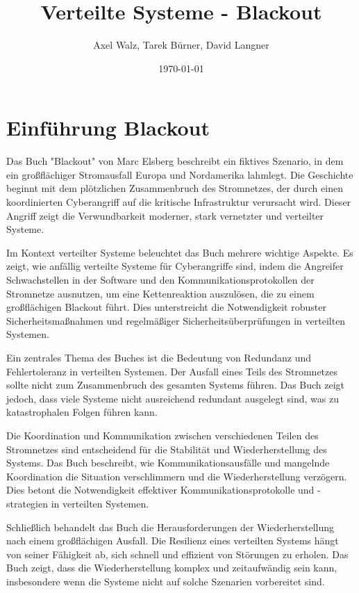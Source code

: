 \documentclass[a4paper,12pt]{article}
\title{Verteilte Systeme - Blackout}
\author{Axel Walz, Tarek Bürner, David Langner}
\date{\today}
\let\stdsection\section
\renewcommand\section{\newpage\stdsection}
\begin{document}
\onehalfspacing %

\maketitle

\newpage 
\tableofcontents
\newpage 

\section{Einführung Blackout}
Das Buch "Blackout" von Marc Elsberg beschreibt ein fiktives Szenario, in dem ein großflächiger Stromausfall Europa und Nordamerika lahmlegt. Die Geschichte beginnt mit dem plötzlichen Zusammenbruch des Stromnetzes, der durch einen koordinierten Cyberangriff auf die kritische Infrastruktur verursacht wird. Dieser Angriff zeigt die Verwundbarkeit moderner, stark vernetzter und verteilter Systeme.

Im Kontext verteilter Systeme beleuchtet das Buch mehrere wichtige Aspekte. Es zeigt, wie anfällig verteilte Systeme für Cyberangriffe sind, indem die Angreifer Schwachstellen in der Software und den Kommunikationsprotokollen der Stromnetze ausnutzen, um eine Kettenreaktion auszulösen, die zu einem großflächigen Blackout führt. Dies unterstreicht die Notwendigkeit robuster Sicherheitsmaßnahmen und regelmäßiger Sicherheitsüberprüfungen in verteilten Systemen.

Ein zentrales Thema des Buches ist die Bedeutung von Redundanz und Fehlertoleranz in verteilten Systemen. Der Ausfall eines Teils des Stromnetzes sollte nicht zum Zusammenbruch des gesamten Systems führen. Das Buch zeigt jedoch, dass viele Systeme nicht ausreichend redundant ausgelegt sind, was zu katastrophalen Folgen führen kann.

Die Koordination und Kommunikation zwischen verschiedenen Teilen des Stromnetzes sind entscheidend für die Stabilität und Wiederherstellung des Systems. Das Buch beschreibt, wie Kommunikationsausfälle und mangelnde Koordination die Situation verschlimmern und die Wiederherstellung verzögern. Dies betont die Notwendigkeit effektiver Kommunikationsprotokolle und -strategien in verteilten Systemen.

Schließlich behandelt das Buch die Herausforderungen der Wiederherstellung nach einem großflächigen Ausfall. Die Resilienz eines verteilten Systems hängt von seiner Fähigkeit ab, sich schnell und effizient von Störungen zu erholen. Das Buch zeigt, dass die Wiederherstellung komplex und zeitaufwändig sein kann, insbesondere wenn die Systeme nicht auf solche Szenarien vorbereitet sind.
\end{document}
